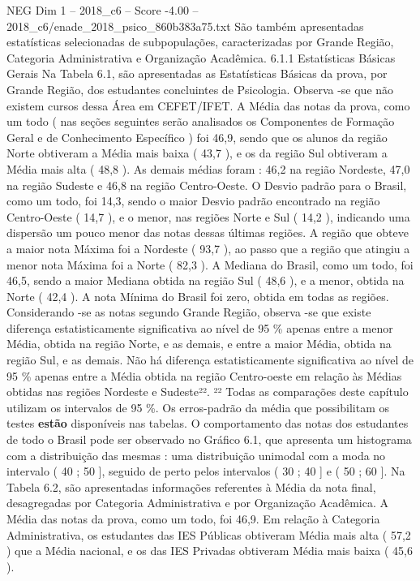 \begin{textsample}{NEG Dim 1 – 2018\_c6 – Score -4.00 – 2018\_c6/enade\_2018\_psico\_860b383a75.txt}
São também apresentadas estatísticas selecionadas de subpopulações, caracterizadas por Grande Região, Categoria Administrativa e Organização Acadêmica. 6.1.1 Estatísticas Básicas Gerais Na Tabela 6.1, são apresentadas as Estatísticas Básicas da prova, por Grande Região, dos estudantes concluintes de Psicologia.
Observa -se que não existem cursos dessa Área em CEFET/IFET.
A Média das notas da prova, como um todo ( nas seções seguintes serão analisados os Componentes de Formação Geral e de Conhecimento Específico ) foi 46,9, sendo que os alunos da região Norte obtiveram a Média mais baixa ( 43,7 ), e os da região Sul obtiveram a Média mais alta ( 48,8 ).
As demais médias foram : 46,2 na região Nordeste, 47,0 na região Sudeste e 46,8 na região Centro-Oeste.
O Desvio padrão para o Brasil, como um todo, foi 14,3, sendo o maior Desvio padrão encontrado na região Centro-Oeste ( 14,7 ), e o menor, nas regiões Norte e Sul ( 14,2 ), indicando uma dispersão um pouco menor das notas dessas últimas regiões.
A região que obteve a maior nota Máxima foi a Nordeste ( 93,7 ), ao passo que a região que atingiu a menor nota Máxima foi a Norte ( 82,3 ).
A Mediana do Brasil, como um todo, foi 46,5, sendo a maior Mediana obtida na região Sul ( 48,6 ), e a menor, obtida na Norte ( 42,4 ).
A nota Mínima do Brasil foi zero, obtida em todas as regiões.
Considerando -se as notas segundo Grande Região, observa -se que existe diferença estatisticamente significativa ao nível de 95 \% apenas entre a menor Média, obtida na região Norte, e as demais, e entre a maior Média, obtida na região Sul, e as demais.
Não há diferença estatisticamente significativa ao nível de 95 \% apenas entre a Média obtida na região Centro-oeste em relação às Médias obtidas nas regiões Nordeste e Sudeste²². ²² Todas as comparações deste capítulo utilizam os intervalos de 95 \%.
Os erros-padrão da média que possibilitam os testes \textbf{estão} disponíveis nas tabelas.
O comportamento das notas dos estudantes de todo o Brasil pode ser observado no Gráfico 6.1, que apresenta um histograma com a distribuição das mesmas : uma distribuição unimodal com a moda no intervalo ( 40 ; 50 ], seguido de perto pelos intervalos ( 30 ; 40 ] e ( 50 ; 60 ].
Na Tabela 6.2, são apresentadas informações referentes à Média da nota final, desagregadas por Categoria Administrativa e por Organização Acadêmica.
A Média das notas da prova, como um todo, foi 46,9.
Em relação à Categoria Administrativa, os estudantes das IES Públicas obtiveram Média mais alta ( 57,2 ) que a Média nacional, e os das IES Privadas obtiveram Média mais baixa ( 45,6 ).

\end{textsample}
